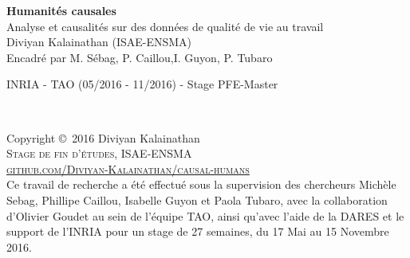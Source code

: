 \documentclass[11pt,fleqn,openany,frenchb]{book} %
\begin{document}

\begingroup
\thispagestyle{empty}
\centering
\vspace*{5cm}
\par\normalfont\fontsize{35}{35}\sffamily\selectfont
\textbf{Humanités causales}\\
{\LARGE Analyse et causalités sur des données de qualité de vie au travail} \\%
\vspace*{0.5cm}
{\Huge Diviyan Kalainathan (ISAE-ENSMA)}\\
{\huge Encadré par M. Sébag, P. Caillou,\newline I. Guyon, P. Tubaro}\par %
{\Large INRIA - TAO (05/2016 - 11/2016) - Stage PFE-Master}\par
\endgroup


\newpage
~\vfill
\thispagestyle{empty}

\noindent Copyright \copyright\ 2016 Diviyan Kalainathan\\ %

\noindent \textsc{Stage de fin d'études, ISAE-ENSMA}\\

\noindent \textsc{\href{https://github.com/Diviyan-Kalainathan/causal-humans}{github.com/Diviyan-Kalainathan/causal-humans}}\\ %


\noindent Ce travail de recherche a été effectué sous la supervision des chercheurs Michèle Sebag, Phillipe Caillou, Isabelle Guyon et Paola Tubaro, avec la collaboration  d'Olivier Goudet au sein de l'équipe TAO, ainsi qu'avec l'aide de la DARES et le support de l'INRIA pour un stage de 27 semaines, du 17 Mai au 15 Novembre 2016. \\ %


\end{document}
